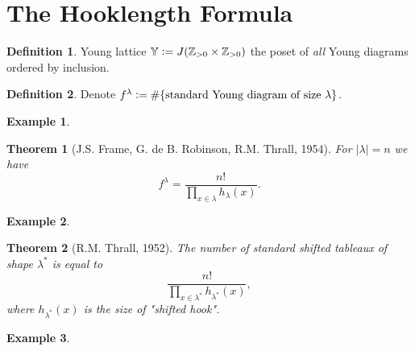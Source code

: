 \documentclass{report}
\newcommand{\Z}{\mathbb{Z}}
\newcommand{\defeq}{\vcentcolon=}
\newtheorem{theorem}{Theorem}[section]
\theoremstyle{definition}
\newtheorem{definition}{Definition}[section]
\newtheorem{example}{Example}[section]
\theoremstyle{remark}
\numberwithin{equation}{section}
\begin{document}
\section{The Hooklength Formula}
\begin{definition}
    Young lattice $\mathbb{Y} \defeq J(\Z_{> 0} \times \Z_{> 0})$ the poset of \emph{all} Young diagrams ordered by inclusion.
\end{definition}

\begin{definition}
    Denote $f^\lambda \defeq \#\{\text{standard Young diagram of size } \lambda\}$.
\end{definition}

\begin{example}
    
\end{example}

\begin{theorem}[J.S. Frame, G. de B. Robinson, R.M. Thrall, 1954]
    For $|\lambda| = n$ we have \[
        f^\lambda = \frac{n!}{\prod_{x \in \lambda}h_\lambda(x)}.    
    \]
\end{theorem}

\begin{example}
    
\end{example}

\begin{theorem}[R.M. Thrall, 1952]
    The number of standard shifted tableaux of shape $\lambda^*$ is equal to \[
        \frac{n!}{\prod_{x \in \lambda^*} h_{\lambda^*}(x)}, 
    \] where $h_{\lambda^*}(x)$ is the size of "shifted hook".
\end{theorem}

\begin{example}
    
\end{example}
\end{document}
